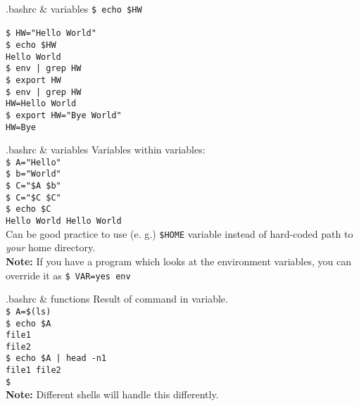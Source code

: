 \documentclass{beamer}
\let\tt\texttt
\let\bf\textbf
\let\it\itshape
\begin{document}
\begin{frame}{.bashrc \& variables}
        \tt{\$ echo \$HW }          \\
        \tt{ }                      \\
        \tt{\$ HW="Hello World" }   \\
        \tt{\$ echo \$HW }          \\
        \tt{Hello World}            \\
        \tt{\$ env | grep HW}       \\
        \tt{\$ export HW}           \\
        \tt{\$ env | grep HW}       \\
        \tt{HW=Hello World}         \\
        \tt{\$ export HW="Bye World"} \\
        \tt{HW=Bye}                 \\
\end{frame}

\begin{frame}{.bashrc \& variables}
        Variables within variables: \\
        \tt{\$ A="Hello"} \\
        \tt{\$ b="World"} \\
        \tt{\$ C="\$A \$b"} \\
        \tt{\$ C="\$C \$C"} \\
        \tt{\$ echo \$C} \\
        \tt{Hello World Hello World} \\
        Can be good practice to use (e. g.) \tt{\$HOME} variable instead of hard-coded path to {\it your} home directory. \\
        \bf{Note:} If you have a program which looks at the environment variables, you can override it as \tt{\$ VAR=yes env}
\end{frame}

\begin{frame}{.bashrc \& functions}
        Result of command in variable.  \\
        \tt{\$ A=\$(ls) }               \\
        \tt{\$ echo \$A }               \\
        \tt{file1}                      \\
        \tt{file2}                      \\
        \tt{\$ echo \$A | head -n1 }    \\
        \tt{file1 file2}                \\
        \tt{\$}                         \\
        \bf{Note:} Different shells will handle this differently.
\end{frame}
\end{document}
